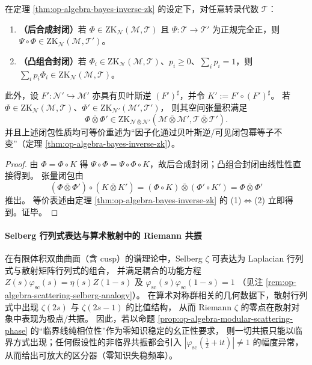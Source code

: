 \begin{corollary}\label{cor:op-algebra-zk-ideal-tensor-closure}
在定理 \ref{thm:op-algebra-bayes-inverse-zk} 的设定下，对任意转录代数 \(\mathcal{T}\)：
\begin{enumerate}
  \item \textbf{（后合成封闭）}若 \(\Phi\in \mathrm{ZK}_{\mathcal{N}}(\mathcal{M},\mathcal{T})\) 且 \(\Psi:\mathcal{T}\to\mathcal{T}'\) 为正规完全正，则 \(\Psi\circ\Phi\in\mathrm{ZK}_{\mathcal{N}}(\mathcal{M},\mathcal{T}')\)。
  \item \textbf{（凸组合封闭）}若 \(\Phi_i\in\mathrm{ZK}_{\mathcal{N}}(\mathcal{M},\mathcal{T})\)、\(p_i\ge 0\)、\(\sum_i p_i=1\)，则 \(\sum_i p_i\Phi_i\in\mathrm{ZK}_{\mathcal{N}}(\mathcal{M},\mathcal{T})\)。
\end{enumerate}
此外，设 \(F':\mathcal{N}'\hookrightarrow\mathcal{M}'\) 亦具有贝叶斯逆 \((F')^\sharp\)，并令 \(K':=F'\circ (F')^\sharp\)。
若 \(\Phi\in\mathrm{ZK}_{\mathcal{N}}(\mathcal{M},\mathcal{T})\)、\(\Phi'\in\mathrm{ZK}_{\mathcal{N}'}(\mathcal{M}',\mathcal{T}')\)，
则其空间张量积满足
\[
\Phi\bar\otimes \Phi'\in \mathrm{ZK}_{\mathcal{N}\bar\otimes \mathcal{N}'}(\mathcal{M}\bar\otimes \mathcal{M}',\mathcal{T}\bar\otimes \mathcal{T}').
\]
并且上述闭包性质均可等价重述为“因子化通过贝叶斯逆/可见闭包幂等子不变”（定理 \ref{thm:op-algebra-bayes-inverse-zk}）。
\end{corollary}
\begin{proof}
由 \(\Phi=\Phi\circ K\) 得
\(
\Psi\circ\Phi=\Psi\circ\Phi\circ K
\)，故后合成封闭；凸组合封闭由线性性直接得到。
张量闭包由
\[
(\Phi\bar\otimes\Phi')\circ (K\bar\otimes K')
=(\Phi\circ K)\bar\otimes(\Phi'\circ K')
=\Phi\bar\otimes\Phi'
\]
推出。
等价表述由定理 \ref{thm:op-algebra-bayes-inverse-zk} 的 (1)$\Leftrightarrow$(2) 立即得到。证毕。
\end{proof}

\paragraph{Selberg 行列式表达与算术散射中的 Riemann 共振}
\begin{remark}\label{rem:op-algebra-selberg-zeros-as-resonances}
在有限体积双曲曲面（含 cusp）的谱理论中，Selberg \(\zeta\) 可表达为 Laplacian 行列式与散射矩阵行列式的组合，
并满足耦合的功能方程 \(Z(s)\varphi_{\mathrm{sc}}(s)=\eta(s)Z(1-s)\) 及 \(\varphi_{\mathrm{sc}}(s)\varphi_{\mathrm{sc}}(1-s)=1\)
（见注 \ref{rem:op-algebra-scattering-selberg-analogy}）。
在算术对称群相关的几何数据下，散射行列式中出现 \(\zeta(2s)\) 与 \(\zeta(2s-1)\) 的比值结构，
从而 Riemann \(\zeta\) 的零点在散射对象中表现为极点/共振。
因此，若以命题 \ref{prop:op-algebra-modular-scattering-phase} 的“临界线纯相位性”作为零知识稳定的幺正性要求，
则一切共振只能以临界方式出现；任何假设性的非临界共振都会引入 \(|\varphi_{\mathrm{sc}}(\tfrac12+\mathrm{i}t)|\neq 1\) 的幅度异常，
从而给出可放大的区分器（零知识失稳频率）。
\end{remark}

